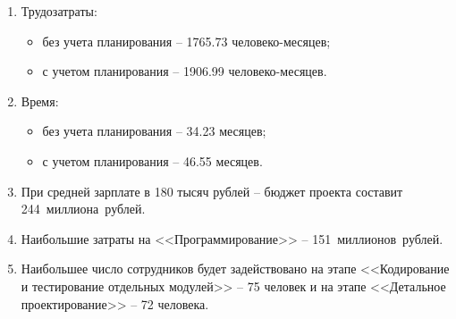 \begin{enumerate}
    \item Трудозатраты:
        \begin{itemize}
            \item без учета планирования -- 1765.73 человеко-месяцев;
            \item с учетом планирования -- 1906.99 человеко-месяцев.
        \end{itemize}
    \item Время:
        \begin{itemize}
            \item без учета планирования -- 34.23 месяцев;
            \item с учетом планирования -- 46.55 месяцев.
        \end{itemize}
    \item При средней зарплате в 180 тысяч рублей -- бюджет проекта составит 244~миллиона~рублей.
    \item Наибольшие затраты на <<Программирование>> -- 151~миллионов~рублей.
    \item Наибольшее число сотрудников будет задействовано на этапе <<Кодирование и тестирование отдельных модулей>> -- 75 человек и на этапе <<Детальное проектирование>> -- 72 человека.
\end{enumerate}
